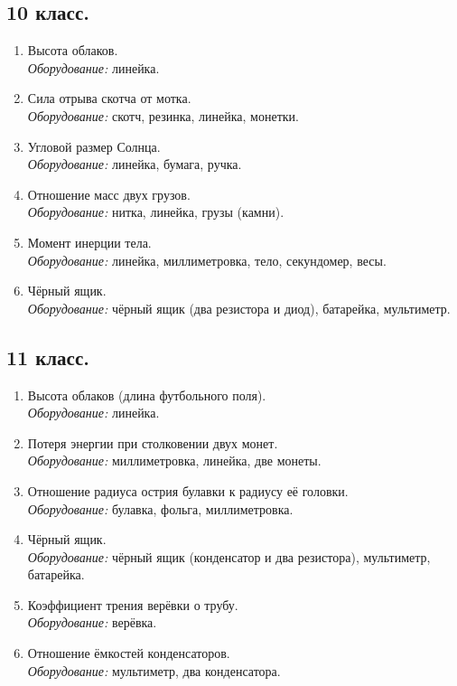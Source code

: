 \documentclass[12pt]{article}
\newlength{\h}
\newlength{\x}
\begin{document}
\subsection{10 класс.}
\label{sec:dayexp10}

\begin{enumerate}
\item Высота облаков.\\
  \textit{Оборудование:} линейка.
\item Сила отрыва скотча от мотка.\\
  \textit{Оборудование:} скотч, резинка, линейка, монетки.
\item Угловой размер Солнца. \\
  \textit{Оборудование:} линейка, бумага, ручка.
\item Отношение масс двух грузов. \\
  \textit{Оборудование:} нитка, линейка, грузы (камни).
\item Момент инерции тела. \\
  \textit{Оборудование:} линейка, миллиметровка, тело, секундомер,
  весы.
\item Чёрный ящик.\\
  \textit{Оборудование:} чёрный ящик (два резистора и диод),
  батарейка, мультиметр. 
\end{enumerate}

\subsection{11 класс.}
\label{sec:dayexp11}

\begin{enumerate}
\item Высота облаков (длина футбольного поля).\\
  \textit{Оборудование:} линейка.
\item Потеря энергии при столковении двух монет. \\
  \textit{Оборудование:} миллиметровка, линейка, две монеты.
\item Отношение радиуса острия булавки к радиусу её головки. \\
  \textit{Оборудование:} булавка, фольга, миллиметровка. 
\item Чёрный ящик. \\
  \textit{Оборудование:} чёрный ящик (конденсатор и два резистора),
  мультиметр, батарейка.
\item Коэффициент трения верёвки о трубу. \\
  \textit{Оборудование:} верёвка.
\item Отношение ёмкостей конденсаторов. \\
  \textit{Оборудование:} мультиметр, два конденсатора. 
\end{enumerate}
\end{document}
